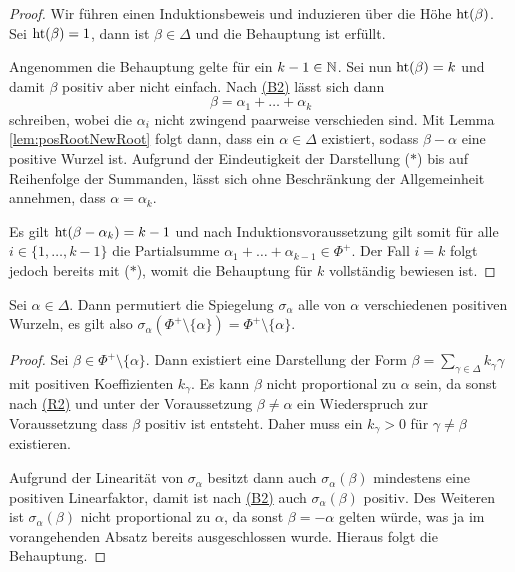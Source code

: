 \begin{proof}
  Wir führen einen Induktionsbeweis und induzieren über die Höhe $\operatorname{ht}(\beta)$.
  Sei $\operatorname{ht}(\beta) = 1$, dann ist $\beta \in \Delta$ und die Behauptung ist erfüllt.

  Angenommen die Behauptung gelte für ein $k-1 \in \mathbb{N}$.
  Sei nun $\operatorname{ht}(\beta) = k$ und damit $\beta$ positiv aber nicht einfach.
  Nach \hyperref[it:B2]{(B2)} lässt sich dann 
  \begin{displaymath}
    \beta = \alpha_1 + \dots + \alpha_k \tag{$\ast$}
  \end{displaymath}
  schreiben, wobei die $\alpha_i$ nicht zwingend paarweise verschieden sind.
  Mit Lemma \ref{lem:posRootNewRoot} folgt dann, dass ein $\alpha \in \Delta$ existiert, sodass $\beta - \alpha$ eine positive Wurzel ist.
  Aufgrund der Eindeutigkeit der Darstellung ($\ast$) bis auf Reihenfolge der Summanden, lässt sich ohne Beschränkung der Allgemeinheit annehmen, dass $\alpha = \alpha_k$.

  Es gilt $\operatorname{ht}(\beta - \alpha_{k}) = k - 1$ und nach Induktionsvoraussetzung gilt 
  somit für alle $i \in \{1,\dots,k-1\}$ die Partialsumme $\alpha_1 + \dots + \alpha_{k-1} \in \Phi^+$.
  Der Fall $i = k$ folgt jedoch bereits mit ($\ast$), womit die Behauptung für $k$ vollständig bewiesen ist.
\end{proof}

\begin{lem}
  \label{lem:permute}
  Sei $\alpha \in \Delta$. 
  Dann permutiert die Spiegelung $\sigma_\alpha$ alle von $\alpha$ verschiedenen positiven Wurzeln, es gilt also $\sigma_\alpha(\Phi^+ \setminus \{\alpha\}) = \Phi^+ \setminus \{\alpha\}$.
\end{lem}

\begin{proof}
  Sei $\beta \in \Phi^+ \setminus \{\alpha\}$. 
  Dann existiert eine Darstellung der Form $\beta = \sum_{\gamma \in \Delta} k_\gamma \gamma$ mit positiven Koeffizienten $k_\gamma$.
  Es kann $\beta$ nicht proportional zu $\alpha$ sein, da sonst nach \hyperref[it:R2]{(R2)} und unter der Voraussetzung $\beta \neq \alpha$ ein Wiederspruch zur Voraussetzung dass $\beta$ positiv ist entsteht.
  Daher muss ein $k_\gamma > 0$ für $\gamma \neq \beta$ existieren.

  Aufgrund der Linearität von $\sigma_\alpha$ besitzt dann auch $\sigma_\alpha(\beta)$ mindestens eine positiven Linearfaktor, damit ist nach \hyperref[it:B2]{(B2)} auch $\sigma_\alpha(\beta)$ positiv.
  Des Weiteren ist $\sigma_\alpha(\beta)$ nicht proportional zu $\alpha$, da sonst $\beta = -\alpha$ gelten würde, was ja im vorangehenden Absatz bereits ausgeschlossen wurde.
  Hieraus folgt die Behauptung.
\end{proof}

